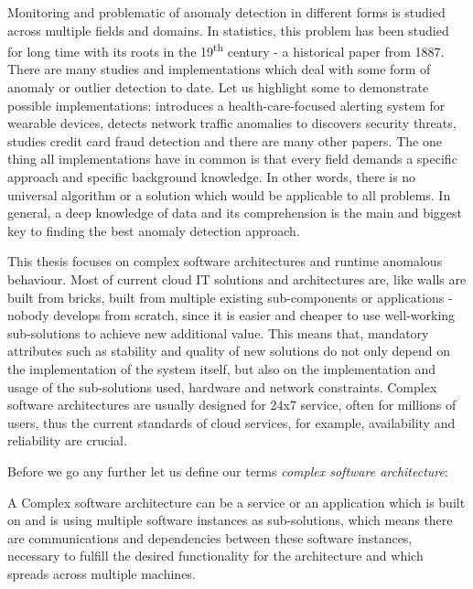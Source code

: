 Monitoring and problematic of anomaly detection in different forms is studied across multiple fields and domains. In statistics, this problem has been studied for long time with its roots in the 19\textsuperscript{th} century - a historical paper \cite{edgeworth1887xli} from 1887. There are many studies and implementations which deal with some form of anomaly or outlier detection to date. Let us highlight some to demonstrate possible implementations: \cite{salem2014online} introduces a health-care-focused alerting system for wear\ms{-}able devices, \cite{rehak2008trust} detects network traffic anomalies to discovers security threats, \cite{bolton2001unsupervised} studies credit card fraud detection and there are many other papers. The one thing all implementations have in common is that every field demands a specific approach and specific background knowledge. In other words, there is no universal algorithm or a solution which would be applicable to all problems. In general, a deep knowledge of data and its comprehension is the main and biggest key to finding the best anomaly detection approach.

This thesis focuses on complex software architectures and runtime anomalous behaviour. Most of current cloud IT solutions and architectures are, like walls are built from bricks, built from multiple existing sub-components or applications - nobody develops from scratch, since it is easier and cheaper to use well-working sub-solutions to achieve new additional value. This means that, mandatory attributes such as stability and quality of new solutions do not only depend on the implementation of the system itself, but also on the implementation and usage of the sub-solutions used, hardware and network constraints. Complex software architectures are usually designed for 24x7 service, often for millions of users, thus the current standards of cloud services, for example, availability and reliability are crucial.

Before we go any further let us define our terms \textit{complex software architecture}:

\begin{definition}\label{def:complexSoftwareArch}A Complex software architecture can be a service or an application which is built on and is using multiple software instances as sub-solutions, which means there are communications and dependencies between these software instances, necessary to fulfill the desired functionality for the architecture and which spreads across multiple machines.
\end{definition}

